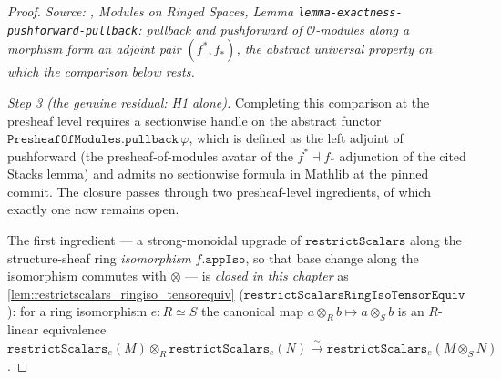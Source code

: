 \begin{proof}
  \textit{Source: \cite{stacks-project}, Modules on Ringed Spaces, Lemma
  \texttt{lemma-exactness-pushforward-pullback}: pullback and pushforward of
  $\mathcal{O}$-modules along a morphism form an adjoint pair $(f^*, f_*)$, the
  abstract universal property on which the comparison below rests.}

  \emph{Step 3 (the genuine residual: H1 alone).} Completing this comparison at the
  presheaf level requires a sectionwise handle on the abstract functor
  \(\mathtt{PresheafOfModules.pullback}\,\varphi\), which is defined as the left
  adjoint of pushforward (the presheaf-of-modules avatar of the
  \(f^* \dashv f_*\) adjunction of the cited Stacks lemma) and admits no
  sectionwise formula in Mathlib at the pinned commit. The closure passes through
  two presheaf-level ingredients, of which exactly one now remains open.

  The first ingredient --- a strong-monoidal upgrade of
  \(\mathtt{restrictScalars}\) along the structure-sheaf ring \emph{isomorphism}
  \(f.\mathtt{appIso}\), so that base change along the isomorphism commutes with
  \(\otimes\) --- is \emph{closed in this chapter} as
  \cref{lem:restrictscalars_ringiso_tensorequiv}
  (\(\mathtt{restrictScalarsRingIsoTensorEquiv}\)): for a ring isomorphism
  \(e : R \simeq S\) the canonical map \(a \otimes_R b \mapsto a \otimes_S b\) is an
  \(R\)-linear equivalence \(\mathtt{restrictScalars}_e(M) \otimes_R
  \mathtt{restrictScalars}_e(N) \xrightarrow{\sim} \mathtt{restrictScalars}_e(M
  \otimes_S N)\).


\end{proof}
